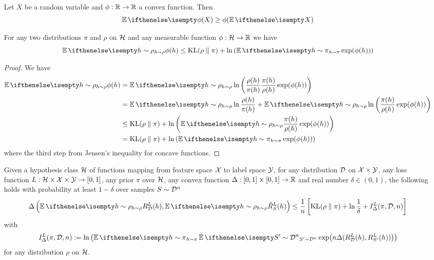 \begin{lemma}
  Let $X$ be a random variable and $\phi : \mathbb{R} \to \mathbb{R}$ a convex function. Then
  \begin{equation}
    \Ev{\phi(X)} \geq \phi(\Ev{X})
  \end{equation}
\end{lemma}

\begin{lemma}
  For any two distributions $\pi$ and $\rho$ on $\mathcal{H}$ and any measurable
  function $\phi : \mathcal{H} \to \mathbb{R}$ we have
  \begin{equation}
    \Ev[h \sim \rho]{\phi(h)} \leq \KL{\rho}{\pi} + \ln\left(\Ev[h \sim
    \pi]{\exp(\phi(h))}\right)
  \end{equation}
\end{lemma}

\begin{proof}
  We have
  \begin{equation}
    \begin{split}
      \Ev[h \sim \rho]{\phi(h)}
      &= \Ev[h \sim \rho]{\ln\left(\frac{\rho(h)}{\pi(h)} \frac{\pi(h)}{\rho(h)}
      \exp(\phi(h))\right)} \\
      &= \Ev[h \sim \rho]{\ln\frac{\rho(h)}{\pi(h)}} + \Ev[h \sim
      \rho]{\ln\left(\frac{\pi(h)}{\rho(h)} \exp(\phi(h))\right)} \\
      &\leq \KL{\rho}{\pi} + \ln\left(\Ev[h \sim \rho]{\frac{\pi(h)}{\rho(h)}
      \exp(\phi(h))}\right) \\
      &= \KL{\rho}{\pi} + \ln\left(\Ev[h \sim \pi]{\exp(\phi(h))}\right)
    \end{split}
  \end{equation}
  where the third step from Jensen's inequality for concave functions.
\end{proof}

\begin{theorem}
  \label{thm:pac-bayes}
  Given a hypothesis class $\mathcal{H}$ of functions mapping from feature space $\mathcal{X}$
  to label space $\mathcal{Y}$, for any distribution $\mathcal{D}$ on $\mathcal{X} \times \mathcal{Y}$, any loss
  function $L : \mathcal{H} \times \mathcal{X} \times \mathcal{Y} \to [0, 1]$, any prior $\pi$ over
  $\mathcal{H}$, any convex function $\Delta : [0, 1] \times [0, 1] \to \mathbb{R}$ and real
  number $\delta \in (0, 1)$, the following holds with probability at least $1 -
  \delta$ over samples $S \sim \mathcal{D}^n$
  \begin{equation}
    \label{eq:pac-bayes-bound}
    \Delta\left(\Ev[h \sim \rho]{R_\CD^L(h)}, \Ev[h \sim
    \rho]{\hat{R}_S^L(h)}\right) \leq \frac{1}{n} \left[\KL{\rho}{\pi} + \ln
    \frac{1}{\delta} + I_\Delta^L(\pi, \CD, n)\right]
  \end{equation}
  with
  \begin{equation}
    I_\Delta^L(\pi, \CD, n) := \ln\left(\Ev[h \sim \pi]{\Ev[S' \sim
    \CD^n]{\exp(n \Delta(R_\CD^L(h), R_{S'}^L(h)))}}\right)
  \end{equation}
  for any distribution $\rho$ on $\mathcal{H}$.
\end{theorem}

